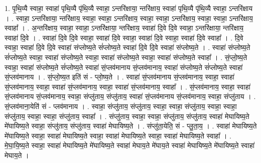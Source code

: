 \documentclass[17pt]{extarticle}
\begin{document}
1. पृ॒थि॒व्यै स्वाहा॒ स्वाहा॑ पृथि॒व्यै पृ॑थि॒व्यै स्वाहा॒ ऽन्तरि॑क्षाया॒ न्तरि॑क्षाय॒ स्वाहा॑ पृथि॒व्यै पृ॑थि॒व्यै स्वाहा॒ ऽन्तरि॑क्षाय । . स्वाहा॒ ऽन्तरि॑क्षाया॒ न्तरि॑क्षाय॒ स्वाहा॒ स्वाहा॒ ऽन्तरि॑क्षाय॒ स्वाहा॒ स्वाहा॒ ऽन्तरि॑क्षाय॒ स्वाहा॒ स्वाहा॒ ऽन्तरि॑क्षाय॒ स्वाहा᳚ । . अ॒न्तरि॑क्षाय॒ स्वाहा॒ स्वाहा॒ ऽन्तरि॑क्षाया॒ न्तरि॑क्षाय॒ स्वाहा॑ दि॒वे दि॒वे स्वाहा॒ ऽन्तरि॑क्षाया॒ न्तरि॑क्षाय॒ स्वाहा॑ दि॒वे । . स्वाहा॑ दि॒वे दि॒वे स्वाहा॒ स्वाहा॑ दि॒वे स्वाहा॒ स्वाहा॑ दि॒वे स्वाहा॒ स्वाहा॑ दि॒वे स्वाहा᳚ । . दि॒वे स्वाहा॒ स्वाहा॑ दि॒वे दि॒वे स्वाहा॑ संप्लोष्य॒ते सं॑प्लोष्य॒ते स्वाहा॑ दि॒वे दि॒वे स्वाहा॑ संप्लोष्य॒ते । . स्वाहा॑ संप्लोष्य॒ते सं॑प्लोष्य॒ते स्वाहा॒ स्वाहा॑ संप्लोष्य॒ते स्वाहा॒ स्वाहा॑ संप्लोष्य॒ते स्वाहा॒ स्वाहा॑ संप्लोष्य॒ते स्वाहा᳚ । . सं॒प्लो॒ष्य॒ते स्वाहा॒ स्वाहा॑ संप्लोष्य॒ते सं॑प्लोष्य॒ते स्वाहा॑ सं॒प्लव॑मानाय सं॒प्लव॑मानाय॒ स्वाहा॑ संप्लोष्य॒ते सं॑प्लोष्य॒ते स्वाहा॑ सं॒प्लव॑मानाय । . सं॒प्लो॒ष्य॒त इति॑ सं - प्लो॒ष्य॒ते । . स्वाहा॑ सं॒प्लव॑मानाय सं॒प्लव॑मानाय॒ स्वाहा॒ स्वाहा॑ सं॒प्लव॑मानाय॒ स्वाहा॒ स्वाहा॑ सं॒प्लव॑मानाय॒ स्वाहा॒ स्वाहा॑ सं॒प्लव॑मानाय॒ स्वाहा᳚ । . सं॒प्लव॑मानाय॒ स्वाहा॒ स्वाहा॑ सं॒प्लव॑मानाय सं॒प्लव॑मानाय॒ स्वाहा॒ संप्लु॑ताय॒ संप्लु॑ताय॒ स्वाहा॑ सं॒प्लव॑मानाय सं॒प्लव॑मानाय॒ स्वाहा॒ संप्लु॑ताय । . सं॒प्लव॑माना॒येति॑ सं - प्लव॑मानाय । . स्वाहा॒ संप्लु॑ताय॒ संप्लु॑ताय॒ स्वाहा॒ स्वाहा॒ संप्लु॑ताय॒ स्वाहा॒ स्वाहा॒ संप्लु॑ताय॒ स्वाहा॒ स्वाहा॒ संप्लु॑ताय॒ स्वाहा᳚ । . संप्लु॑ताय॒ स्वाहा॒ स्वाहा॒ संप्लु॑ताय॒ संप्लु॑ताय॒ स्वाहा॑ मेघायिष्य॒ते मे॑घायिष्य॒ते स्वाहा॒ संप्लु॑ताय॒ संप्लु॑ताय॒ स्वाहा॑ मेघायिष्य॒ते । . संप्लु॑ता॒येति॒ सं - प्लु॒ता॒य॒ । . स्वाहा॑ मेघायिष्य॒ते मे॑घायिष्य॒ते स्वाहा॒ स्वाहा॑ मेघायिष्य॒ते स्वाहा॒ स्वाहा॑ मेघायिष्य॒ते स्वाहा॒ स्वाहा॑ मेघायिष्य॒ते स्वाहा᳚ । . मे॒घा॒यि॒ष्य॒ते स्वाहा॒ स्वाहा॑ मेघायिष्य॒ते मे॑घायिष्य॒ते स्वाहा॑ मेघाय॒ते मे॑घाय॒ते स्वाहा॑ मेघायिष्य॒ते मे॑घायिष्य॒ते स्वाहा॑ मेघाय॒ते । \newline
\end{document}
